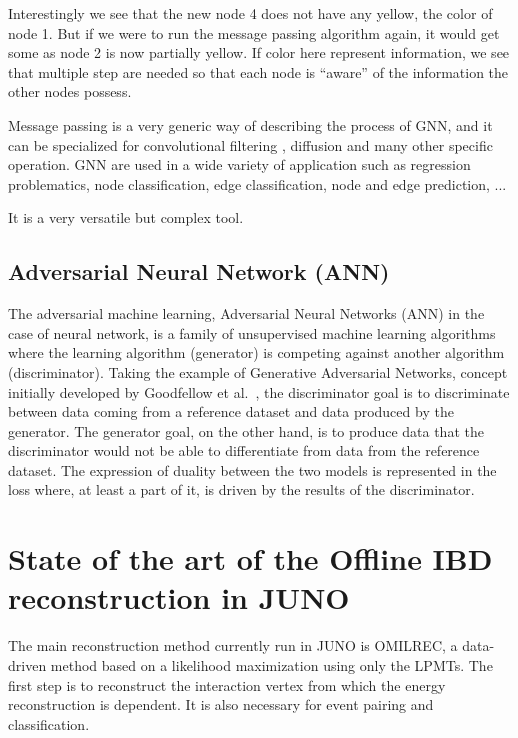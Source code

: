 \documentclass[../main.tex]{subfiles}
\begin{document}
Interestingly we see that the new node 4 does not have any yellow, the color of node 1. But if we were to run the message passing algorithm again, it would get some as node 2 is now partially yellow. If color here represent information, we see that multiple step are needed so that each node is ``aware'' of the information the other nodes possess.


Message passing is a very generic way of describing the process of GNN, and it can be specialized for convolutional filtering \cite{defferrard_convolutional_2017}, diffusion \cite{li_diffusion_2018} and many other specific operation. GNN are used in a wide variety of application such as regression problematics, node classification, edge classification, node and edge prediction, ...


It is a very versatile but complex tool.

\subsection{Adversarial Neural Network (ANN)}

The adversarial machine learning, Adversarial Neural Networks (ANN) in the case of neural network, is a family of unsupervised machine learning algorithms where the learning algorithm (generator) is competing against another algorithm (discriminator). Taking the example of Generative Adversarial Networks, concept initially developed by Goodfellow et al.\ \cite{goodfellow_generative_2014}, the discriminator goal is to discriminate between data coming from a reference dataset and data produced by the generator.
The generator goal, on the other hand, is to produce data that the discriminator would not be able to differentiate from data from the reference dataset. The expression of duality between the two models is represented in the loss where, at least a part of it, is driven by the results of the discriminator.

\section{State of the art of the Offline IBD reconstruction in JUNO}
\label{sec:juno:reco}

The main reconstruction method currently run in JUNO is OMILREC, a data-driven method based on a likelihood maximization \cite{wu_new_2019, huang_improving_2021} using only the LPMTs. The first step is to reconstruct the interaction vertex from which the energy reconstruction is dependent. It is also necessary for event pairing and classification.
\end{document}
